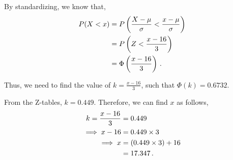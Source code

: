 \begin{subquestions}
\begin{subsubquestions}

\subsubquestion

By standardizing, we know that,
\begin{align}
	P(X<x) & = P\left(\frac{X-\mu}{\sigma} < \frac{x - \mu}{\sigma}\right) \nonumber \\
	       & = P\left(Z < \frac{x - 16}{3}\right) \nonumber \\
	       & = \Phi\left(\frac{x-16}{3}\right) \,.
\end{align}

Thus, we need to find the value of $k=\frac{x-16}{3}$, such that $\Phi(k)=0.6732$. 

From the Z-tables, $k=0.449$. Therefore, we can find $x$ as follows,
\begin{align}
	k = \frac{x-16}{3} & = 0.449 \nonumber \\
	   \implies x-16 & = 0.449 \times 3 \nonumber \\
	   \implies x & = (0.449 \times 3) + 16 \nonumber \\
	              & = 17.347 \,.
\end{align}

\end{subsubquestions}

\end{subquestions}